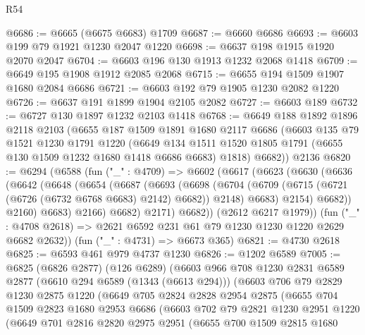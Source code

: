\begin{lexlean}{R54}
\begin{coremodule}
@6686 := @6665 (@6675 @6683) @1709
@6687 := @6660 @6686
@6693 := @6603 @199 @79 @1921 @1230 @2047 @1220
@6698 := @6637 @198 @1915 @1920 @2070 @2047
@6704 := @6603 @196 @130 @1913 @1232 @2068 @1418
@6709 := @6649 @195 @1908 @1912 @2085 @2068
@6715 := @6655 @194 @1509 @1907 @1680 @2084 @6686
@6721 := @6603 @192 @79 @1905 @1230 @2082 @1220
@6726 := @6637 @191 @1899 @1904 @2105 @2082
@6727 := @6603 @189
@6732 := @6727 @130 @1897 @1232 @2103 @1418
@6768 := @6649
    @188
    @1892
    @1896
    @2118
    @2103
    (@6655
      @187
      @1509
      @1891
      @1680
      @2117
      @6686
      (@6603
        @135
        @79
        @1521
        @1230
        @1791
        @1220
        (@6649 @134 @1511 @1520 @1805 @1791 (@6655 @130 @1509 @1232 @1680 @1418 @6686 @6683) @1818)
        @6682))
    @2136
@6820 := @6294
    (@6588
      (fun ("_" : @4709) =>
      @6602
        (@6617
          (@6623
            (@6630
              (@6636
                (@6642
                  (@6648
                    (@6654
                      (@6687
                        (@6693
                          (@6698
                            (@6704
                              (@6709 (@6715 (@6721 (@6726 (@6732 @6768 @6683) @2142) @6682)) @2148)
                              @6683)
                            @2154)
                          @6682))
                      @2160)
                    @6683)
                  @2166)
                @6682)
              @2171)
            @6682))
        (@2612 @6217 @1979))
      (fun ("_" : @4708 @2618) => @2621 @6592 @231 @61 @79 @1230 @1230 @1220 @2629 @6682 @2632))
    (fun ("_" : @4731) => @6673 @365)
@6821 := @4730 @2618
@6825 := @6593 @461 @979 @4737 @1230
@6826 := @1202 @6589
@7005 := @6825
    (@6826 @2877)
    (@126 @6289)
    (@6603
      @966
      @708
      @1230
      @2831
      @6589
      @2877
      (@6610 @294 @6589 (@1343 (@6613 @294)))
      (@6603
        @706
        @79
        @2829
        @1230
        @2875
        @1220
        (@6649
          @705
          @2824
          @2828
          @2954
          @2875
          (@6655
            @704
            @1509
            @2823
            @1680
            @2953
            @6686
            (@6603
              @702
              @79
              @2821
              @1230
              @2951
              @1220
              (@6649
                @701
                @2816
                @2820
                @2975
                @2951
                (@6655
                  @700
                  @1509
                  @2815
                  @1680

\end{coremodule}
\end{lexlean}
